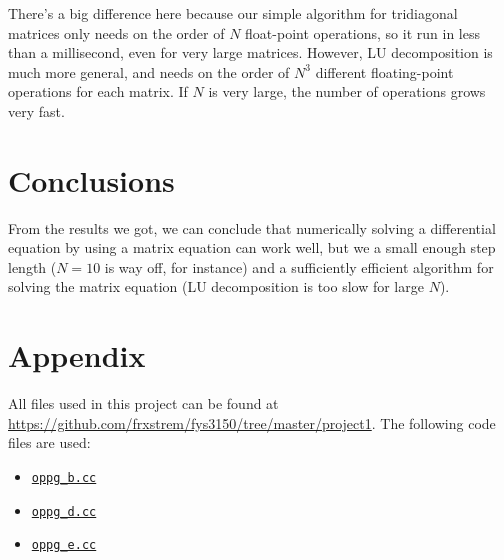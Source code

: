 \documentclass[12pt,a4paper]{article}
\begin{document}
There's a big difference here because our simple algorithm for tridiagonal matrices only needs on the order of $N$ float-point operations, so it run in less than a millisecond, even for very large matrices. However, LU decomposition is much more general, and needs on the order of $N^3$ different floating-point operations for each matrix. If $N$ is very large, the number of operations grows very fast.

\section{Conclusions}

From the results we got, we can conclude that numerically solving a differential equation by using a matrix equation can work well, but we a small enough step length ($N = 10$ is way off, for instance) and a sufficiently efficient algorithm for solving the matrix equation (LU decomposition is too slow for large $N$).

\clearpage
\appendix
\section{Appendix}

All files used in this project can be found at \url{https://github.com/frxstrem/fys3150/tree/master/project1}.
The following code files are used:
\begin{itemize}
  \item \href{https://github.com/frxstrem/fys3150/tree/master/project1/oppg_b.cc}{\tt oppg\_b.cc}
  \item \href{https://github.com/frxstrem/fys3150/tree/master/project1/oppg_d.cc}{\tt oppg\_d.cc}
  \item \href{https://github.com/frxstrem/fys3150/tree/master/project1/oppg_e.cc}{\tt oppg\_e.cc}
\end{itemize}

\clearpage

\printbibliography[heading=bibnumbered,title=Bibliography]
\end{document}
